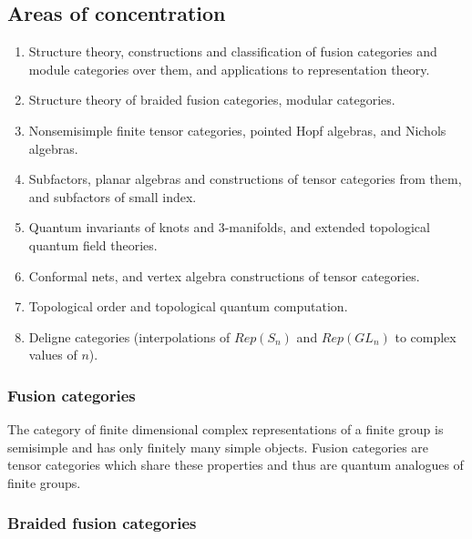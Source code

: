\documentclass[11pt]{article}
\begin{document}



\subsection{Areas of concentration}
\begin{enumerate}
\item Structure theory, constructions and classification of fusion categories and module categories over them, and applications to representation theory.
\item Structure theory of braided fusion categories, modular categories.
\item Nonsemisimple finite tensor categories, pointed Hopf algebras, and Nichols algebras.
\item Subfactors, planar algebras and constructions of tensor categories from them, and subfactors of small index.
\item Quantum invariants of knots and 3-manifolds, and extended topological quantum field theories.
\item Conformal nets, and vertex algebra constructions of tensor categories.
\item Topological order and topological quantum computation.
\item Deligne categories (interpolations of $Rep(S_n)$ and $Rep(GL_n)$ to complex values of $n$).
\end{enumerate}

\subsubsection{Fusion categories}
The category of finite dimensional complex representations of a finite group is semisimple and has only finitely many simple objects.  Fusion categories are tensor categories which share these properties and thus are quantum analogues of finite groups.  



\subsubsection{Braided fusion categories}

\end{document}
